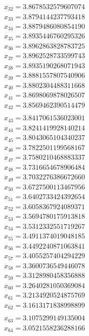\begin{multicols}{3}
\begin{align*}
		x_{32} = 3.8678532579607074\\
		x_{33} = 3.8794144237793418\\
		x_{34} = 3.8879486080854190\\
		x_{35} = 3.8935446760295326\\
		x_{36} = 3.8962863828783725\\
		x_{37} = 3.8962528733599743\\
		x_{38} = 3.8935190268071943\\
		x_{39} = 3.8881557807540906\\
		x_{40} = 3.8802304488311668\\
		x_{41} = 3.8698069878026507\\
		x_{42} = 3.8569462390514479\\
	\end{align*}
	\vfill
	\columnbreak
	\begin{align*}
		x_{43} = 3.8417061536023001\\
		x_{44} = 3.8241419928140214\\
		x_{45} = 3.8043065104340237\\
		x_{46} = 3.7822501199568167\\
		x_{47} = 3.7580210468883337\\
		x_{48} = 3.7316654678906484\\
		x_{49} = 3.7032276386672660\\
		x_{50} = 3.6727500113467956\\
		x_{51} = 3.6402733424392654\\
		x_{52} = 3.6058367924089371\\
		x_{53} = 3.5694780175913818\\
		x_{54} = 3.5312332551719267\\
		x_{55} = 3.4911374019048185\\
		x_{56} = 3.4492240871063841\\
		x_{57} = 3.4055257404294229\\
		x_{58} = 3.3600736549446078\\
		x_{59} = 3.3128980458356888\\
		x_{60} = 3.2640281050369084\\
		x_{61} = 3.2134920524875769\\
		x_{62} = 3.1613171838998899\\
	\end{align*}
	\vfill
	\columnbreak
	\begin{align*}
		x_{63} = 3.1075299149135004\\
		x_{64} = 3.0521558236288166\\

\end{align*}
\end{multicols}
